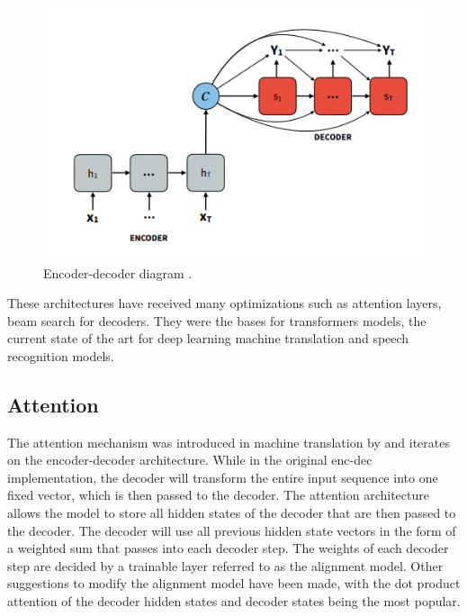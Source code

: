 \documentclass{tex_files/kththesis}
\begin{document}
\begin{figure}[H]
    \centering
    \includegraphics[scale=0.6]{images/background/encoder.PNG}
    \caption{Encoder-decoder diagram \cite{attentionplots}.}
\end{figure}

These architectures have received many optimizations such as attention layers, beam search for decoders. They were the bases for transformers models, the current state of the art for deep learning machine translation and speech recognition models.

\subsection{Attention}
The attention mechanism was introduced in machine translation by \cite{attention} and iterates on the encoder-decoder architecture. While in the original enc-dec implementation, the decoder will transform the entire input sequence into one fixed vector, which is then passed to the decoder. The attention architecture allows the model to store all hidden states of the decoder that are then passed to the decoder. The decoder will use all previous hidden state vectors in the form of a weighted sum that passes into each decoder step. The weights of each decoder step are decided by a trainable layer referred to as the alignment model. Other suggestions to modify the alignment model have been made, with the dot product attention of the decoder hidden states and decoder states being the most popular.
\end{document}
